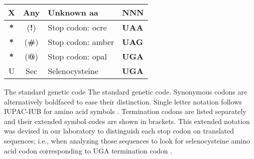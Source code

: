 \begin{table}[]
\begin{center}
\begin{tabular}{|c|c|l|l|}
\hline
X & Any & Unknown aa & \textbf{NNN} \\
\hline
\hline %
\textbf{*} & (\textbf{!})  & Stop codon: ocre  & \textbf{UAA} \\
\hline
\textbf{*} & (\textbf{\#}) & Stop codon: amber & \textbf{UAG} \\
\hline
\textbf{*} & (\textbf{@})  & Stop codon: opal  & \textbf{UGA} \\ %
\hline
U & Sec & Selenocysteine  & \textbf{UGA} \\ %
\hline
\end{tabular}
          {The standard genetic code}%
          {The standard genetic code.}%
          {%
  Synonymous codons are
  alternatively boldfaced to ease their distinction. Single letter
  notation follows IUPAC-IUB for amino acid symbols
  \citep{iupaciub1984:6743224, iupaciub1993:8477694}. Termination
  codons
  are listed separately and their extended symbol codes are shown in
  brackets. This extended notation was devised in our laboratory to
  distinguish each stop codon on translated sequences; i.e., when
  analyzing those sequences to look for
  selenocysteine amino acid codon
  corresponding to UGA termination codon
  \citep{hatfield2002:11997494}.
           }%
\end{center}
\end{table}


